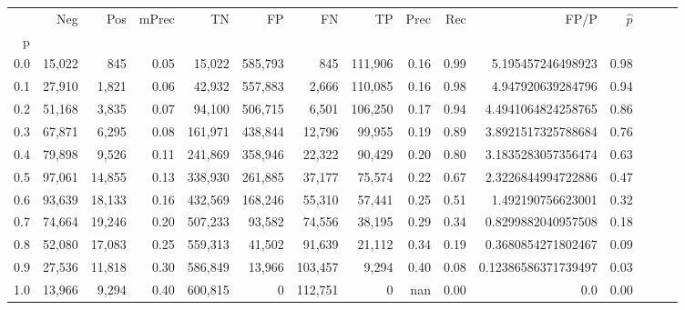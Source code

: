 \begin{tabular}{rrrrrrrrrrrrrrr}
\toprule
{} &     Neg &     Pos & mPrec &       TN &       FP &       FN &       TP &  Prec &   Rec &                 FP/P & $\hat{p}$ \\
p   &         &         &       &          &          &          &          &       &       &                      &           \\
\midrule
0.0 &  15,022 &     845 &  0.05 &   15,022 &  585,793 &      845 &  111,906 &  0.16 &  0.99 &    5.195457246498923 &      0.98 \\
0.1 &  27,910 &   1,821 &  0.06 &   42,932 &  557,883 &    2,666 &  110,085 &  0.16 &  0.98 &    4.947920639284796 &      0.94 \\
0.2 &  51,168 &   3,835 &  0.07 &   94,100 &  506,715 &    6,501 &  106,250 &  0.17 &  0.94 &   4.4941064824258765 &      0.86 \\
0.3 &  67,871 &   6,295 &  0.08 &  161,971 &  438,844 &   12,796 &   99,955 &  0.19 &  0.89 &   3.8921517325788684 &      0.76 \\
0.4 &  79,898 &   9,526 &  0.11 &  241,869 &  358,946 &   22,322 &   90,429 &  0.20 &  0.80 &   3.1835283057356474 &      0.63 \\
0.5 &  97,061 &  14,855 &  0.13 &  338,930 &  261,885 &   37,177 &   75,574 &  0.22 &  0.67 &   2.3226844994722886 &      0.47 \\
0.6 &  93,639 &  18,133 &  0.16 &  432,569 &  168,246 &   55,310 &   57,441 &  0.25 &  0.51 &    1.492190756623001 &      0.32 \\
0.7 &  74,664 &  19,246 &  0.20 &  507,233 &   93,582 &   74,556 &   38,195 &  0.29 &  0.34 &   0.8299882040957508 &      0.18 \\
0.8 &  52,080 &  17,083 &  0.25 &  559,313 &   41,502 &   91,639 &   21,112 &  0.34 &  0.19 &   0.3680854271802467 &      0.09 \\
0.9 &  27,536 &  11,818 &  0.30 &  586,849 &   13,966 &  103,457 &    9,294 &  0.40 &  0.08 &  0.12386586371739497 &      0.03 \\
1.0 &  13,966 &   9,294 &  0.40 &  600,815 &        0 &  112,751 &        0 &   nan &  0.00 &                  0.0 &      0.00 \\
\bottomrule
\end{tabular}
